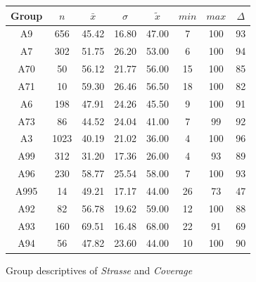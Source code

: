 \begin{figure}[ht!]
	\centering
	\begin{minipage}{0.5\textwidth}
		\tiny
		\centering
		\begin{tabular}{c|c|c|c|c|c|c|c}
			\toprule
			Group & $n$ & $\bar{x}$ & $\sigma$ & $\tilde{x}$ & $min$ & $max$ & $\Delta$ \\
			\midrule
			A9   & 656  & 45.42 & 16.80 & 47.00 & 7  & 100 & 93 \\ 
			A7   & 302  & 51.75 & 26.20 & 53.00 & 6  & 100 & 94 \\ 
			A70  & 50   & 56.12 & 21.77 & 56.00 & 15 & 100 & 85 \\ 
			A71  & 10   & 59.30 & 26.46 & 56.50 & 18 & 100 & 82 \\ 
			A6   & 198  & 47.91 & 24.26 & 45.50 & 9  & 100 & 91 \\ 
			A73  & 86   & 44.52 & 24.04 & 41.00 & 7  & 99  & 92 \\ 
			A3   & 1023 & 40.19 & 21.02 & 36.00 & 4  & 100 & 96 \\ 
			A99  & 312  & 31.20 & 17.36 & 26.00 & 4  & 93  & 89 \\ 
			A96  & 230  & 58.77 & 25.54 & 58.00 & 7  & 100 & 93 \\ 
			A995 & 14   & 49.21 & 17.17 & 44.00 & 26 & 73  & 47 \\ 
			A92  & 82   & 56.78 & 19.62 & 59.00 & 12 & 100 & 88 \\ 
			A93  & 160  & 69.51 & 16.48 & 68.00 & 22 & 91  & 69 \\ 
			A94  & 56   & 47.82 & 23.60 & 44.00 & 10 & 100 & 90 \\ 
			\bottomrule
		\end{tabular}
		\label{tbl:descriptives_arbis_matched_Strasse_Cov}
	\end{minipage}%
	\begin{minipage}{0.55\textwidth}
		\tiny
		\centering
		\vfill
		\label{fig:descriptives_arbis_matched_Strasse_Cov}
	\end{minipage}%
	\caption{Group descriptives of \textit{Strasse} and \textit{Coverage}}
\end{figure}
